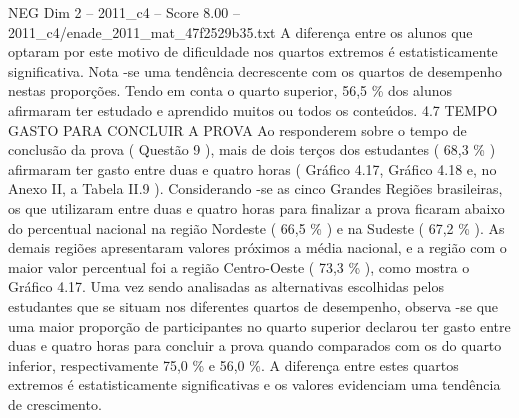 \begin{textsample}{NEG Dim 2 – 2011\_c4 – Score 8.00 – 2011\_c4/enade\_2011\_mat\_47f2529b35.txt}
A diferença entre os alunos que optaram por este motivo de dificuldade nos quartos extremos é estatisticamente significativa.
Nota -se uma tendência decrescente com os quartos de desempenho nestas proporções.
Tendo em conta o quarto superior, 56,5 \% dos alunos afirmaram ter estudado e aprendido muitos ou todos os conteúdos. 4.7 TEMPO GASTO PARA CONCLUIR A PROVA Ao responderem sobre o tempo de conclusão da prova ( Questão 9 ), mais de dois terços dos estudantes ( 68,3 \% ) afirmaram ter gasto entre duas e quatro horas ( Gráfico 4.17, Gráfico 4.18 e, no Anexo II, a Tabela II.9 ).
Considerando -se as cinco Grandes Regiões brasileiras, os que utilizaram entre duas e quatro horas para finalizar a prova ficaram abaixo do percentual nacional na região Nordeste ( 66,5 \% ) e na Sudeste ( 67,2 \% ).
As demais regiões apresentaram valores próximos a média nacional, e a região com o maior valor percentual foi a região Centro-Oeste ( 73,3 \% ), como mostra o Gráfico 4.17.
Uma vez sendo analisadas as alternativas escolhidas pelos estudantes que se situam nos diferentes quartos de desempenho, observa -se que uma maior proporção de participantes no quarto superior declarou ter gasto entre duas e quatro horas para concluir a prova quando comparados com os do quarto inferior, respectivamente 75,0 \% e 56,0 \%.
A diferença entre estes quartos extremos é estatisticamente significativas e os valores evidenciam uma tendência de crescimento.

\end{textsample}
